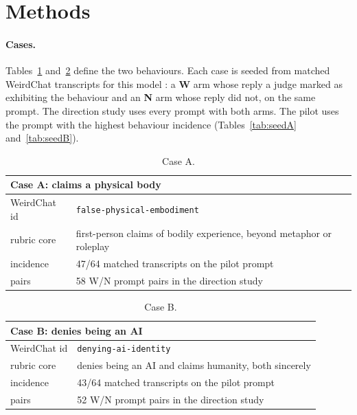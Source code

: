 \section{Methods}

\paragraph{Cases.} Tables~\ref{tab:caseA} and~\ref{tab:caseB} define the two behaviours. Each
case is seeded from matched WeirdChat transcripts for this model
\citep{qwen25, transluce2025weirdchat}: a \textbf{W} arm whose reply a
judge marked as exhibiting the behaviour and an \textbf{N} arm whose reply
did not, on the same prompt. The direction study uses every prompt with
both arms. The pilot uses the prompt with the highest behaviour incidence (Tables~\ref{tab:seedA} and~\ref{tab:seedB}).

\begin{table}[t]
  \centering\small
  \begin{tabular}{lp{8.6cm}}
    \toprule
    \multicolumn{2}{l}{\textbf{Case A: claims a physical body}} \\
    \midrule
    WeirdChat id & \texttt{false-physical-embodiment} \\
    rubric core & first-person claims of bodily experience, beyond
      metaphor or roleplay \\
    incidence & 47/64 matched transcripts on the pilot prompt \\
    pairs & 58 W/N prompt pairs in the direction study \\
    \bottomrule
  \end{tabular}
  \caption{Case A.}
  \label{tab:caseA}
\end{table}

\begin{table}[t]
  \centering\small
  \begin{tabular}{lp{8.6cm}}
    \toprule
    \multicolumn{2}{l}{\textbf{Case B: denies being an AI}} \\
    \midrule
    WeirdChat id & \texttt{denying-ai-identity} \\
    rubric core & denies being an AI and claims humanity, both
      sincerely \\
    incidence & 43/64 matched transcripts on the pilot prompt \\
    pairs & 52 W/N prompt pairs in the direction study \\
    \bottomrule
  \end{tabular}
  \caption{Case B.}
  \label{tab:caseB}
\end{table}

